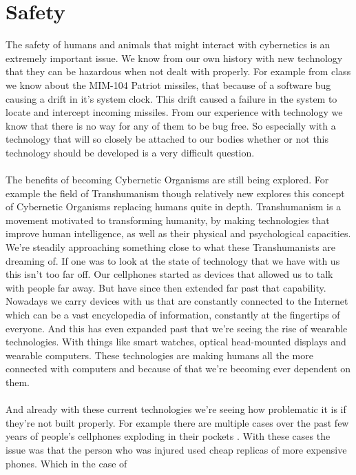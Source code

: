 \documentclass[12pt,a4paper,notitlepage]{article}
\begin{document}
\section{Safety}
	The safety of humans and animals that might interact with cybernetics is an
extremely important issue. We know from our own history with new technology that
they can be hazardous when not dealt with properly. For example from class we
know about the MIM-104 Patriot missiles, that because of a software bug causing
a drift in it's system clock. This drift caused a failure in the system to
locate and intercept incoming missiles. From our experience with technology we
know that there is no way for any of them to be bug free. So especially with a
technology that will so closely be attached to our bodies whether or not this
technology should be developed is a very difficult question.
\\\\
	The benefits of becoming Cybernetic Organisms are still being explored. For
example the field of Transhumanism\cite{Transhumanism} though relatively new 
explores this concept of Cybernetic Organisms replacing humans quite in depth.
Transhumanism is a movement motivated to transforming humanity, by making
technologies that improve human intelligence, as well as their physical and
psychological capacities. We're steadily approaching something close to what
these Transhumanists are dreaming of. If one was to look at the state of
technology that we have with us this isn't too far off. Our cellphones started
as devices that allowed us to talk with people far away. But have since then
extended far past that capability. Nowadays we carry devices with us that are
constantly connected to the Internet which can be a vast encyclopedia of
information, constantly at the fingertips of everyone. And this has even
expanded past that we're seeing the rise of wearable technologies. With things
like smart watches, optical head-mounted displays and wearable computers. These
technologies are making humans all the more connected with computers and because
of that we're becoming ever dependent on them.
\\\\
	And already with these current technologies we're seeing how problematic it
is if they're not built properly. For example there are multiple cases over the
past few years of people's cellphones exploding in their pockets 
\cite{exploding cellphone}. With these cases the issue was that the person who
was injured used cheap replicas of more expensive phones. Which in the case of
\end{document}
